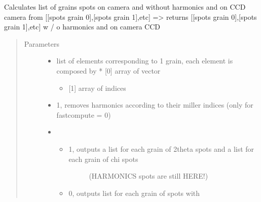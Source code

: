 \documentclass[letterpaper,10pt,english]{sphinxmanual}
\begin{document}

\begin{fulllineitems}
\label{\detokenize{Simulation_Module:LaueTools.lauecore.filterLaueSpots}}
Calculates list of grains spots on camera and without harmonics
and on CCD camera from {[}{[}spots grain 0{]},{[}spots grain 1{]},etc{]} =\textgreater{}
returns {[}{[}spots grain 0{]},{[}spots grain 1{]},etc{]} w / o harmonics and on camera  CCD
\begin{quote}\begin{description}
\item[{Parameters}] \leavevmode\begin{itemize}
\item {} 
 \textendash{} 
list of elements corresponding to 1 grain, each element is composed by
* {[}0{]} array of vector
\begin{itemize}
\item {} 
{[}1{]} array of indices

\end{itemize}


\item {} 
 \textendash{} 1, removes harmonics according to their miller indices
(only for fastcompute = 0)

\item {} 
 \textendash{} \begin{itemize}
\item {} \begin{description}
\item[{1, outputs a list for each grain of 2theta spots and a list for each grain of chi spots}] \leavevmode
(HARMONICS spots are still HERE!)

\end{description}

\item {} 
0, outputs list for each grain of spots with

\end{itemize}



\end{itemize}
\end{description}
\end{quote}
\end{fulllineitems}
\end{document}
